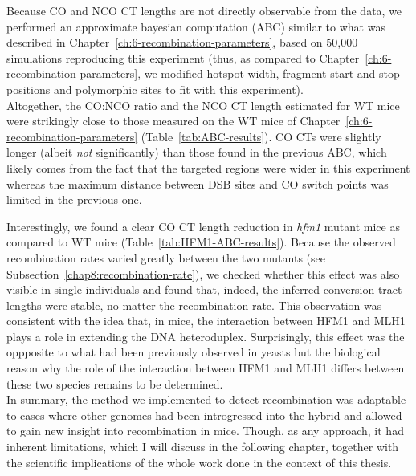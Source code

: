 Because CO and NCO CT lengths are not directly observable from the data, we performed an approximate bayesian computation (ABC) similar to what was described in Chapter~\ref{ch:6-recombination-parameters}, based on 50,000 simulations reproducing this experiment (thus, as compared to Chapter~\ref{ch:6-recombination-parameters}, we modified hotspot width, fragment start and stop positions and polymorphic sites to fit with this experiment).\\




Altogether, the CO:NCO ratio and the NCO CT length estimated for WT mice were strikingly close to those measured on the WT mice of Chapter~\ref{ch:6-recombination-parameters} (Table~\ref{tab:ABC-results}).
CO CTs were slightly longer (albeit \textit{not} significantly) than those found in the previous ABC, which likely comes from the fact that the targeted regions were wider in this experiment whereas the maximum distance between DSB sites and CO switch points was limited in the previous one.

Interestingly, we found a clear CO CT length reduction in \textit{hfm1} mutant mice as compared to WT mice (Table~\ref{tab:HFM1-ABC-results}).
Because the observed recombination rates varied greatly between the two mutants (see Subsection~\ref{chap8:recombination-rate}), we checked whether this effect was also visible in single individuals and found that, indeed, the inferred conversion tract lengths were stable, no matter the recombination rate.
This observation was consistent with the idea that, in mice, the interaction between HFM1 and MLH1 plays a role in extending the DNA heteroduplex.
Surprisingly, this effect was the oppposite to what had been previously observed in yeasts \citep{duroc2017concerted} but the biological reason why the role of the interaction between HFM1 and MLH1 differs between these two species remains to be determined.\\


In summary, the method we implemented to detect recombination was adaptable to cases where other genomes had been introgressed into the hybrid and allowed to gain new insight into recombination in mice.
Though, as any approach, it had inherent limitations, which I will discuss in the following chapter, together with the scientific implications of the whole work done in the context of this thesis.



